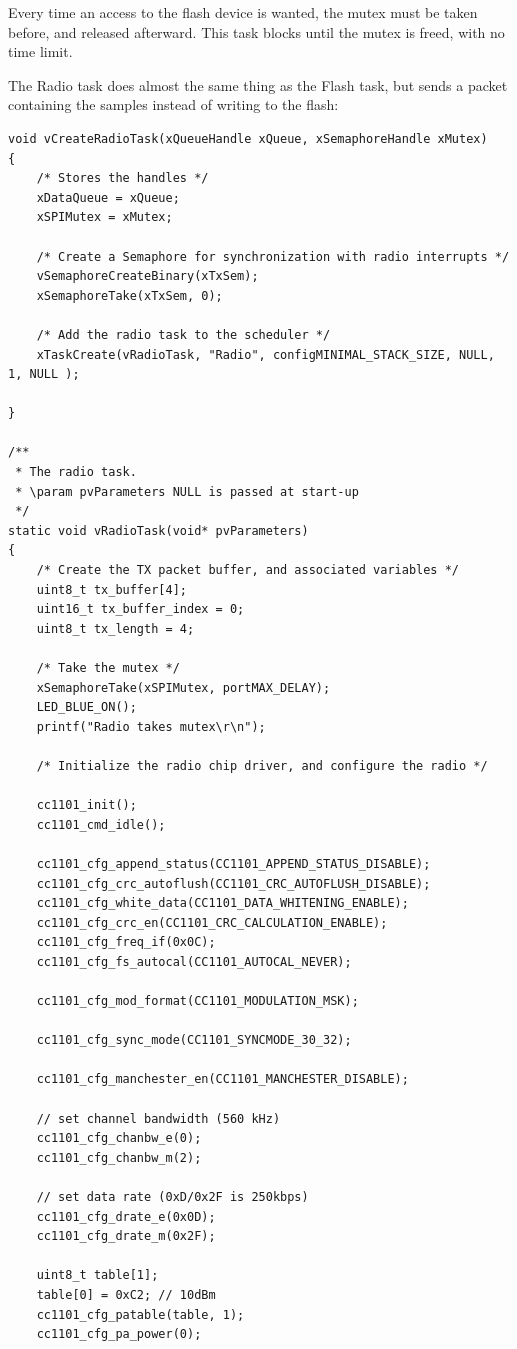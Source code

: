 \documentclass[11pt]{report}
\begin{document}
Every time an access to the flash device is wanted, the mutex must be taken before, and released afterward. This task blocks until the mutex is freed, with no time limit.

The Radio task does almost the same thing as the Flash task, but sends a packet containing the samples instead of writing to the flash:
\begin{verbatim}
void vCreateRadioTask(xQueueHandle xQueue, xSemaphoreHandle xMutex)
{
    /* Stores the handles */
    xDataQueue = xQueue;
    xSPIMutex = xMutex;
    
    /* Create a Semaphore for synchronization with radio interrupts */
    vSemaphoreCreateBinary(xTxSem);
    xSemaphoreTake(xTxSem, 0);
    
    /* Add the radio task to the scheduler */
    xTaskCreate(vRadioTask, "Radio", configMINIMAL_STACK_SIZE, NULL, 1, NULL );
    
}

/**
 * The radio task.
 * \param pvParameters NULL is passed at start-up
 */
static void vRadioTask(void* pvParameters)
{
    /* Create the TX packet buffer, and associated variables */
    uint8_t tx_buffer[4];
    uint16_t tx_buffer_index = 0;
    uint8_t tx_length = 4;
    
    /* Take the mutex */
    xSemaphoreTake(xSPIMutex, portMAX_DELAY);
    LED_BLUE_ON();
    printf("Radio takes mutex\r\n");
    
    /* Initialize the radio chip driver, and configure the radio */
    
    cc1101_init();
    cc1101_cmd_idle();
    
    cc1101_cfg_append_status(CC1101_APPEND_STATUS_DISABLE);
    cc1101_cfg_crc_autoflush(CC1101_CRC_AUTOFLUSH_DISABLE);
    cc1101_cfg_white_data(CC1101_DATA_WHITENING_ENABLE);
    cc1101_cfg_crc_en(CC1101_CRC_CALCULATION_ENABLE);
    cc1101_cfg_freq_if(0x0C);
    cc1101_cfg_fs_autocal(CC1101_AUTOCAL_NEVER);

    cc1101_cfg_mod_format(CC1101_MODULATION_MSK);

    cc1101_cfg_sync_mode(CC1101_SYNCMODE_30_32);

    cc1101_cfg_manchester_en(CC1101_MANCHESTER_DISABLE);

    // set channel bandwidth (560 kHz)
    cc1101_cfg_chanbw_e(0);
    cc1101_cfg_chanbw_m(2);

    // set data rate (0xD/0x2F is 250kbps)
    cc1101_cfg_drate_e(0x0D);
    cc1101_cfg_drate_m(0x2F);

    uint8_t table[1];
    table[0] = 0xC2; // 10dBm
    cc1101_cfg_patable(table, 1);
    cc1101_cfg_pa_power(0);
    

\end{verbatim}
\end{document}
